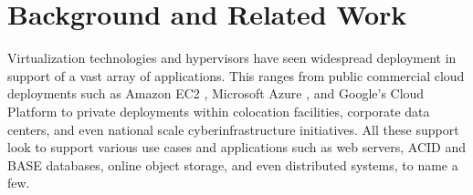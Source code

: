 \documentclass[10pt]{sigplanconf}
\begin{document}





 


\section{Background and Related Work}\label{Background}


Virtualization technologies and hypervisors have seen widespread deployment in support of a vast array of applications.  This ranges from public commercial cloud deployments such as Amazon EC2 \cite{amazon2010}, Microsoft Azure \cite{jennings2010cloud}, and Google's Cloud Platform \cite{www-google-platform} to private deployments within colocation facilities, corporate data centers, and even national scale cyberinfrastructure initiatives.  All these support look to support various use cases and applications such as web servers, ACID and BASE databases, online object storage, and even distributed systems, to name a few.  
\end{document}
